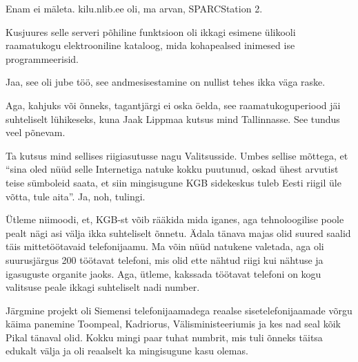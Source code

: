
Enam ei mäleta. kilu.nlib.ee oli, ma arvan, 
SPARCStation 2.

Kusjuures selle serveri põhiline funktsioon oli ikkagi esimene ülikooli 
raamatukogu  elektrooniline kataloog, mida kohapealsed inimesed ise 
programmeerisid.


Jaa, see oli jube töö, see andmesisestamine on  nullist tehes ikka väga raske.

Aga, kahjuks või õnneks, tagantjärgi ei oska öelda, see raamatukoguperiood jäi 
suhteliselt lühikeseks, kuna Jaak Lippmaa kutsus mind 
Tallinnasse. See tundus veel põnevam. 

Ta kutsus mind sellises riigiasutusse nagu Valitsusside. 
Umbes sellise mõttega, et \enquote{sina oled nüüd selle Internetiga natuke 
kokku puutunud, oskad ühest arvutist teise sümboleid saata, et siin mingisugune 
KGB sidekeskus tuleb Eesti riigil üle võtta, tule aita}. Ja, noh, tulingi.

Ütleme niimoodi, et, KGB-st võib rääkida mida iganes, aga tehnoloogilise poole 
pealt nägi asi välja ikka suhteliselt õnnetu. Ädala tänava 
majas olid suured saalid täis mittetöötavaid 
telefonijaamu. Ma võin nüüd natukene valetada, aga oli suurusjärgus 200 
töötavat telefoni, mis olid  ette nähtud riigi kui nähtuse ja igasuguste 
organite jaoks. Aga, ütleme, kakssada töötavat telefoni on kogu valitsuse peale 
ikkagi suhteliselt nadi number.

Järgmine projekt oli Siemensi telefonijaamadega reaalse sisetelefonijaamade 
võrgu käima panemine Toompeal, Kadriorus, Välisministeeriumis ja kes nad seal 
kõik Pikal tänaval olid. Kokku mingi paar tuhat numbrit, mis tuli õnneks täitsa 
edukalt välja ja oli reaalselt ka mingisugune kasu olemas.


